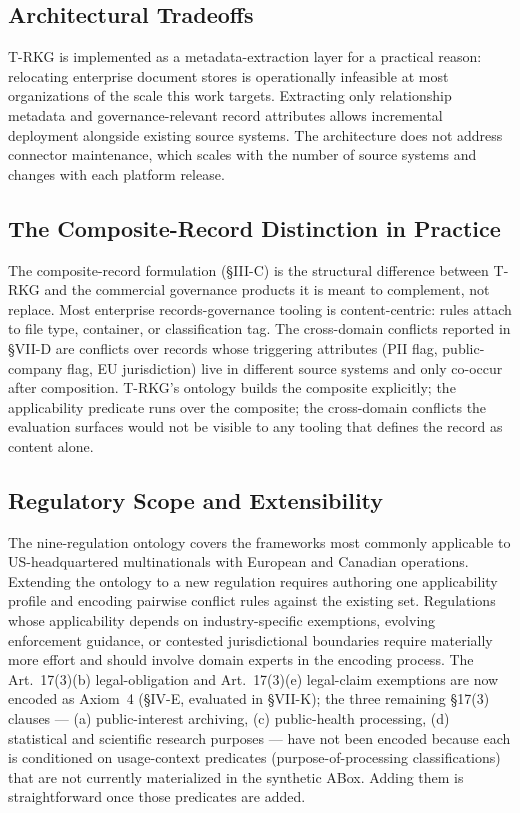 \documentclass{ieeeaccess}
\begin{document}
\subsection{Architectural Tradeoffs}

T-RKG is implemented as a metadata-extraction layer for a practical reason: relocating enterprise document stores is operationally infeasible at most organizations of the scale this work targets. Extracting only relationship metadata and governance-relevant record attributes allows incremental deployment alongside existing source systems. The architecture does not address connector maintenance, which scales with the number of source systems and changes with each platform release.

\subsection{The Composite-Record Distinction in Practice}

The composite-record formulation (§III-C) is the structural difference between T-RKG and the commercial governance products it is meant to complement, not replace. Most enterprise records-governance tooling is content-centric: rules attach to file type, container, or classification tag. The cross-domain conflicts reported in §VII-D are conflicts over records whose triggering attributes (PII flag, public-company flag, EU jurisdiction) live in different source systems and only co-occur after composition. T-RKG's ontology builds the composite explicitly; the applicability predicate runs over the composite; the cross-domain conflicts the evaluation surfaces would not be visible to any tooling that defines the record as content alone.

\subsection{Regulatory Scope and Extensibility}

The nine-regulation ontology covers the frameworks most commonly applicable to US-headquartered multinationals with European and Canadian operations. Extending the ontology to a new regulation requires authoring one applicability profile and encoding pairwise conflict rules against the existing set. Regulations whose applicability depends on industry-specific exemptions, evolving enforcement guidance, or contested jurisdictional boundaries require materially more effort and should involve domain experts in the encoding process. The Art.~17(3)(b) legal-obligation and Art.~17(3)(e) legal-claim exemptions are now encoded as Axiom~4 (§IV-E, evaluated in §VII-K); the three remaining §17(3) clauses --- (a) public-interest archiving, (c) public-health processing, (d) statistical and scientific research purposes --- have not been encoded because each is conditioned on usage-context predicates (purpose-of-processing classifications) that are not currently materialized in the synthetic ABox. Adding them is straightforward once those predicates are added.
\end{document}
